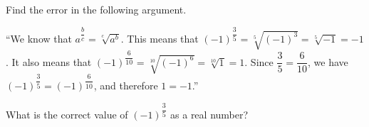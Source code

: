 Find the error in the following argument.

``We know that $a^{\dfrac bc}=\sqrt[c]{a^b}$. This means that $(-1)^{\dfrac35}=\sqrt[5]{(-1)^3}=\sqrt[5]{-1}=-1$. It also means that $(-1)^{\dfrac{6}{10}}=\sqrt[10]{(-1)^6}=\sqrt[10]{1}=1$. Since $\dfrac35=\dfrac{6}{10}$, we have $(-1)^{\dfrac35}=(-1)^{\dfrac{6}{10}}$, and therefore $1=-1$.''

What is the correct value of $(-1)^{\dfrac35}$ as a real number?
